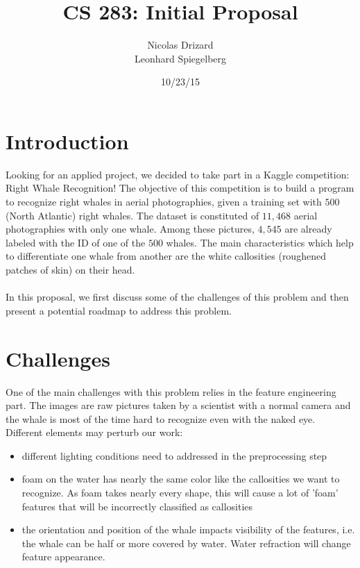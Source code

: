 \documentclass[11pt,a4paper,oneside]{report}
\begin{document}
\title{CS 283: Initial Proposal}
\author{Nicolas Drizard \\
Leonhard Spiegelberg}
\date{10/23/15}

\maketitle

\newpage

\section*{Introduction}

Looking for an applied project, we decided to take part in a Kaggle competition: Right Whale Recognition! The objective of this competition is to build a program to recognize right whales in aerial photographies, given a training set with $500$ (North Atlantic) right whales. The dataset is constituted of $11,468$ aerial photographies with only one whale. Among these pictures, $4,545$ are already labeled with the ID of one of the $500$ whales. The main characteristics which help to differentiate one whale from another are the white callosities (roughened patches of skin) on their head.\\
\\

In this proposal, we first discuss some of the challenges of this problem and then present a potential roadmap to address this problem.


\section*{Challenges}

One of the main challenges with this problem relies in the feature engineering part. The images are raw pictures taken by a scientist with a normal camera and the whale is most of the time hard to recognize even with the naked eye. Different elements may perturb our work:
\begin{itemize}
	\item different lighting conditions need to addressed in the preprocessing step
	\item foam on the water has nearly the same color like the callosities we want to recognize. As foam takes nearly every shape, this will cause a lot of 'foam' features that will be incorrectly classified as callosities
	\item the orientation and position of the whale impacts visibility of the features, i.e. the whale can be half or more covered by water. Water refraction will change feature appearance.
\end{itemize}
\end{document}
